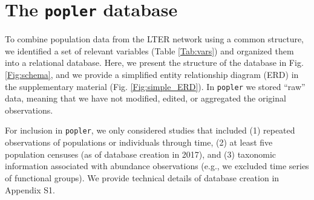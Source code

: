 \documentclass{article}\usepackage[]{graphicx}\usepackage[]{color}
\begin{document}
\section*{The \texttt{popler} database}
To combine population data from the LTER network using a common structure, we identified a set of relevant variables (Table \ref{Tab:vars}) and organized them into a relational database. Here, we present the structure of the database in Fig. \ref{Fig:schema}, and we provide a simplified entity relationship diagram (ERD) in the supplementary material (Fig. \ref{Fig:simple_ERD}). In \texttt{popler} we stored ``raw'' data, meaning that we have not modified, edited, or aggregated the original observations.

For inclusion in \texttt{popler}, we only considered studies that included (1) repeated observations of populations or individuals through time, (2) at least five population censuses (as of database creation in 2017), and (3) taxonomic information associated with abundance observations (e.g., we excluded time series of functional groups). We provide technical details of database creation in Appendix S1.
\end{document}
